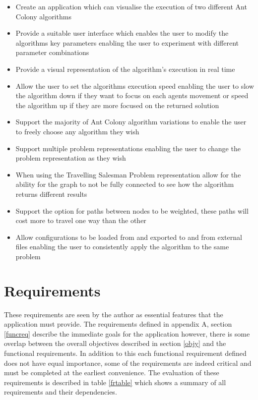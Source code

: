 \begin{itemize}
\item Create an application which can visualise the execution of two different Ant Colony algorithms
\item Provide a suitable user interface which enables the user to modify the algorithms key parameters enabling the user to experiment with different parameter combinations
\item Provide a visual representation of the algorithm’s execution in real time
\item Allow the user to set the algorithms execution speed enabling the user to slow the algorithm down if they want to focus on each agents movement or speed the algorithm up if they are more focused on the returned solution
\item Support the majority of Ant Colony algorithm variations to enable the user to freely choose any algorithm they wish
\item Support multiple problem representations enabling the user to change the problem representation as they wish
\item When using the Travelling Salesman Problem representation allow for the ability for the graph to not be fully connected to see how the algorithm returns different results
\item Support the option for paths between nodes to be weighted, these paths will cost more to travel one way than the other
\item Allow configurations to be loaded from and exported to and from external files enabling the user to consistently apply the algorithm to the same problem
\end{itemize}


\section{Requirements}
\label{funcymcdunky}
These requirements are seen by the author as essential features that the application must provide. The requirements defined in appendix A, section \ref{funcreq} describe the immediate goals for the application however, there is some overlap between the overall objectives described in section \ref{objy} and the functional requirements. In addition to this each functional requirement defined does not have equal importance, some of the requirements are indeed critical and must be completed at the earliest convenience. The evaluation of these requirements is described in table \ref{frtable} which shows a summary of all requirements and their dependencies.

